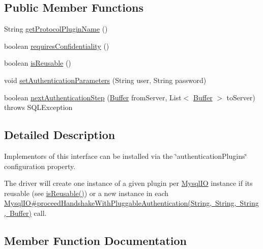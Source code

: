 \subsection*{Public Member Functions}
\begin{DoxyCompactItemize}
\item 
String \mbox{\hyperlink{interfacecom_1_1mysql_1_1jdbc_1_1_authentication_plugin_a90dfb5c717939a248527c5bdf512b510}{get\+Protocol\+Plugin\+Name}} ()
\item 
boolean \mbox{\hyperlink{interfacecom_1_1mysql_1_1jdbc_1_1_authentication_plugin_a38b8ca6ee23b3b3e47de1549bb784a7d}{requires\+Confidentiality}} ()
\item 
boolean \mbox{\hyperlink{interfacecom_1_1mysql_1_1jdbc_1_1_authentication_plugin_abf6de7affb05904b1dba5517a17421d1}{is\+Reusable}} ()
\item 
void \mbox{\hyperlink{interfacecom_1_1mysql_1_1jdbc_1_1_authentication_plugin_af47d83abdb04823681f23b027ec19379}{set\+Authentication\+Parameters}} (String user, String password)
\item 
boolean \mbox{\hyperlink{interfacecom_1_1mysql_1_1jdbc_1_1_authentication_plugin_a1ed9558616b029386dc24bcade409f3d}{next\+Authentication\+Step}} (\mbox{\hyperlink{classcom_1_1mysql_1_1jdbc_1_1_buffer}{Buffer}} from\+Server, List$<$ \mbox{\hyperlink{classcom_1_1mysql_1_1jdbc_1_1_buffer}{Buffer}} $>$ to\+Server)  throws S\+Q\+L\+Exception
\end{DoxyCompactItemize}


\subsection{Detailed Description}
Implementors of this interface can be installed via the \char`\"{}authentication\+Plugins\char`\"{} configuration property.

The driver will create one instance of a given plugin per \mbox{\hyperlink{classcom_1_1mysql_1_1jdbc_1_1_mysql_i_o}{Mysql\+IO}} instance if it\textquotesingle{}s reusable (see \mbox{\hyperlink{interfacecom_1_1mysql_1_1jdbc_1_1_authentication_plugin_abf6de7affb05904b1dba5517a17421d1}{is\+Reusable()}}) or a new instance in each \mbox{\hyperlink{}{Mysql\+I\+O\#proceed\+Handshake\+With\+Pluggable\+Authentication(\+String, String, String, Buffer)}} call. 

\subsection{Member Function Documentation}
\mbox{\label{interfacecom_1_1mysql_1_1jdbc_1_1_authentication_plugin_a90dfb5c717939a248527c5bdf512b510}} 
